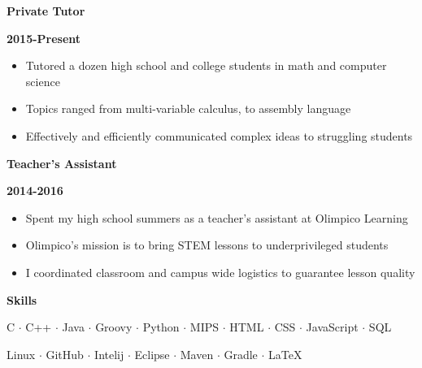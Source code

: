 \documentclass[12pt]{report}
\newcommand\barTitle[1]{\begin{center} \begin{Large}{\textbf{#1}}\end{Large}\end{center}}
\newcommand\tbf[1]{\begin{large} \textbf{#1} \end{large}}
\begin{document}
\begin{flushleft}
\tbf{Private Tutor} \hfill \tbf{2015-Present}
\end{flushleft}

\begin{itemize}
\item Tutored a dozen high school and college students in math and computer science
\item Topics ranged from multi-variable calculus, to assembly language 
\item Effectively and efficiently communicated complex ideas to struggling students 
\end{itemize}

\begin{flushleft}
\tbf{Teacher's Assistant} \hfill \tbf{2014-2016}
\end{flushleft}

\begin{itemize}
\item Spent my high school summers as a teacher's assistant at Olimpico Learning
\item Olimpico's mission is to bring STEM lessons to underprivileged students
\item I coordinated classroom and campus wide logistics to guarantee lesson quality  
\end{itemize}


\noindent\makebox[\linewidth]{\rule{7.5in}{0.4pt}}
\barTitle{Skills}
\begin{center}
C $\cdot$ C++ $\cdot$ Java $\cdot$ Groovy $\cdot$ Python $\cdot$  MIPS $\cdot$ HTML $\cdot$ CSS $\cdot$ JavaScript $\cdot$ SQL 
\end{center}
\begin{center}
 Linux $\cdot$ GitHub $\cdot$ Intelij $\cdot$ Eclipse $\cdot$ Maven $\cdot$ Gradle $\cdot$ LaTeX
\end{center}
\end{document}
